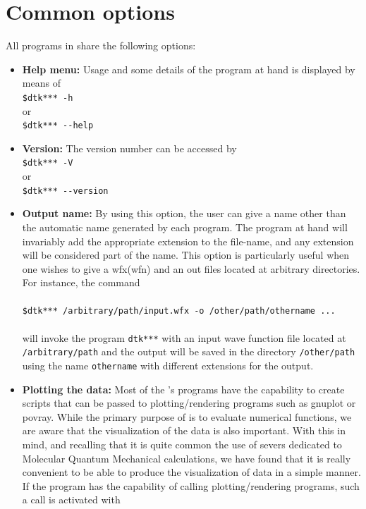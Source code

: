 \section{Common options}\label{sec:commonopts}

All programs in \DTK{} share the following options:

\begin{itemize}
   \item \textbf{Help menu:} Usage and some details of the program at hand is displayed by means of\\
   \phantom{MMM}\texttt{\$dtk*** -h}\\or\\
   \phantom{MMM}\texttt{\$dtk*** {-}-help}
   \item \textbf{Version:} The version number can be accessed by\\
   \phantom{MMM}\texttt{\$dtk*** -V}\\or\\
   \phantom{MMM}\texttt{\$dtk*** {-}-version}
   \item\textbf{Output name:} By using this option, the user can give a name other than the automatic name generated by each program. The program at hand will invariably add the appropriate extension to the file-name, and any extension will be considered part of the name.
   This option is particularly useful when one wishes to give a wfx(wfn) and an out files located at arbitrary directories. For instance, the command\\\phantom{adf}\\
   \phantom{MMM}\texttt{\$dtk*** /arbitrary/path/input.wfx -o /other/path/othername ...}\\\phantom{adf}\\
   will invoke the program \texttt{dtk***} with an input wave function file located at \texttt{/arbit\-rary\-/path} and the output will be saved in the directory \texttt{/other/path} using the name \texttt{othername} with different extensions for the output.
   \item \textbf{Plotting the data:} Most of the \DTK's programs have the capability to create scripts that can be passed to plotting/rendering programs such as gnuplot or povray. While the primary purpose of \DTK{} is to evaluate numerical functions, we are aware that the visualization of the data is also important. With this in mind, and recalling that it is quite common the use of severs dedicated to Molecular Quantum Mechanical calculations, we have found that it is really convenient to be able to produce the visualization of data in a simple manner. If the program has the capability of calling plotting/rendering programs, such a call is activated with\\

\end{itemize}
